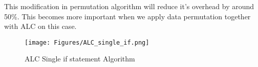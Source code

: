  This modification in permutation algorithm will reduce it's overhead by around 50\%. This becomes more important when we apply data permutation together with ALC on this case.

\begin{figure*}[h]
  \centering
  \texttt{[image: Figures/ALC\_single\_if.png]}
  \caption{ALC Single if statement Algorithm}
\end{figure*}

\fi

